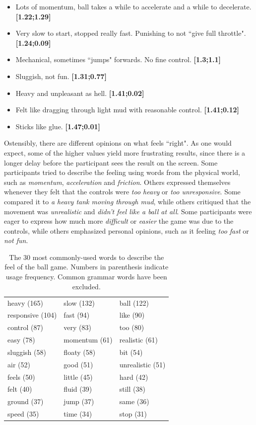 \begin{itemize}[noitemsep,nolistsep]
\item Lots of momentum, ball takes a while to accelerate and a while to decelerate. \textbf{[1.22;1.29]}
\item Very slow to start, stopped really fast. Punishing to not ``give full throttle". \textbf{[1.24;0.09]}
\item Mechanical, sometimes ``jumps" forwards. No fine control. \textbf{[1.3;1.1]}
\item Sluggish, not fun. \textbf{[1.31;0.77]}
\item Heavy and unpleasant as hell. \textbf{[1.41;0.02]}
\item Felt like dragging through light mud with reasonable control. \textbf{[1.41;0.12]}
\item Sticks like glue. \textbf{[1.47;0.01]}
\end{itemize}

Ostensibly, there are different opinions on what feels ``right". As one would expect, some of the higher values yield more frustrating results, since there is a longer delay before the participant sees the result on the screen. Some participants tried to describe the feeling using words from the physical world, such as \textit{momentum}, \textit{acceleration} and \textit{friction}. Others expressed themselves whenever they felt that the controls were \textit{too heavy} or \textit{too unresponsive}. Some compared it to \textit{a heavy tank moving through mud}, while others critiqued that the movement was \textit{unrealistic} and \textit{didn't feel like a ball at all}. Some participants were eager to express how much more \textit{difficult} or \textit{easier} the game was due to the controls, while others emphasized personal opinions, such as it feeling \textit{too fast} or \textit{not fun}.

\begin{table} \centering
\caption{The 30 most commonly-used words to describe the feel of the ball game. Numbers in parenthesis indicate usage frequency. Common grammar words have been excluded.}
\label{table:mostWords}
\begin{tabular}{lll}
\toprule
heavy (165) & slow (132) & ball (122)\\
responsive (104) & fast (94) & like (90)\\
control (87) & very (83) & too (80)\\ 
easy (78) & momentum (61) & realistic (61)\\
sluggish (58) & floaty (58) & bit (54)\\
air  (52) & good (51) & unrealistic (51)\\
feels (50) & little (45) & hard (42)\\
felt (40) & fluid (39) & still (38)\\
ground (37) & jump (37) & same (36)\\
speed (35) & time (34) & stop (31)\\
\bottomrule
\end{tabular}
\end{table}

